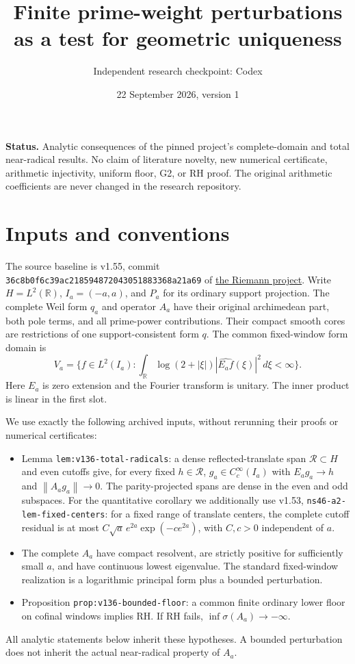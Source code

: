 \documentclass[11pt]{article}
\title{Finite prime-weight perturbations as a test for geometric uniqueness}
\author{Independent research checkpoint: Codex}
\date{22 September 2026, version 1}
\newcommand{\norm}[1]{\left\|#1\right\|}
\newcommand{\R}{\mathbb R}
\begin{document}
\maketitle
\noindent\textbf{Status.} Analytic consequences of the pinned project's complete-domain
and total near-radical results. No claim of literature novelty, new numerical
certificate, arithmetic injectivity, uniform floor, G2, or RH proof.
The original arithmetic coefficients are never changed in the research repository.

\section{Inputs and conventions}
The source baseline is v1.55, commit
\texttt{36c8b0f6c39ac218594872043051883368a21a69} of
\href{https://github.com/AlexanderEastwood/riemann}{the Riemann project}.
Write $H=L^2(\R)$, $I_a=(-a,a)$, and $P_a$ for its ordinary support projection.
The complete Weil form $q_a$ and operator $A_a$ have their original
archimedean part, both pole terms, and all prime-power contributions.
Their compact smooth cores are restrictions of one support-consistent form $q$.
The common fixed-window form domain is
\[
 V_a=\{f\in L^2(I_a):\int_\R\log(2+|\xi|)
           |\widehat{E_af}(\xi)|^2\,d\xi<\infty\}.
\]
Here $E_a$ is zero extension and the Fourier transform is unitary.
The inner product is linear in the first slot.

We use exactly the following archived inputs, without rerunning their proofs
or numerical certificates:
\begin{itemize}
\item Lemma \texttt{lem:v136-total-radicals}: a dense reflected-translate
span $\mathcal R\subset H$ and even cutoffs give, for every fixed
$h\in\mathcal R$, $g_a\in C_c^\infty(I_a)$ with
$E_ag_a\to h$ and $\norm{A_ag_a}\to0$.
The parity-projected spans are dense in the even and odd subspaces.
For the quantitative corollary we additionally use v1.53,
\texttt{ns46-a2-lem-fixed-centers}: for a fixed range of translate
centers, the complete cutoff residual is at most
$C\sqrt a\,e^{2a}\exp(-c e^{2a})$, with $C,c>0$ independent of $a$.
\item The complete $A_a$ have compact resolvent, are strictly positive
for sufficiently small $a$, and have continuous lowest eigenvalue.
The standard fixed-window realization is a logarithmic principal form
plus a bounded perturbation.
\item Proposition \texttt{prop:v136-bounded-floor}: a common finite
ordinary lower floor on cofinal windows implies RH. If RH fails,
$\inf\sigma(A_a)\to-\infty$.
\end{itemize}
All analytic statements below inherit these hypotheses. A bounded perturbation
does not inherit the actual near-radical property of $A_a$.
\end{document}
